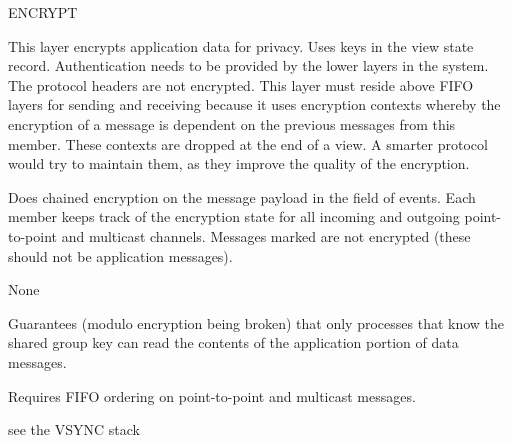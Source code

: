 \begin{Layer}{ENCRYPT}

This layer encrypts application data for privacy.  Uses keys in the view state
record.  Authentication needs to be provided by the lower layers in the system.
The protocol headers are not encrypted.  This layer must reside above FIFO
layers for sending and receiving because it uses encryption contexts whereby
the encryption of a message is dependent on the previous messages from this
member.  These contexts are dropped at the end of a view.  A smarter protocol
would try to maintain them, as they improve the quality of the encryption.

\begin{Protocol}
Does chained encryption on the message payload in the  field of
events.  Each member keeps track of the encryption state for all incoming and
outgoing point-to-point and multicast channels.  Messages marked
 are not encrypted (these should not be application
messages).
\end{Protocol}

\begin{Parameters}
\item None
\end{Parameters}

\begin{Properties}
\item
Guarantees (modulo encryption being broken) that only processes that know the
shared group key can read the contents of the application portion of data
messages.
\item
Requires FIFO ordering on point-to-point and multicast messages.
\end{Properties}

\begin{Sources}
\end{Sources}

\begin{GenEvent}
\end{GenEvent}

\begin{Testing}
\item
see the VSYNC stack
\end{Testing}
\end{Layer}
